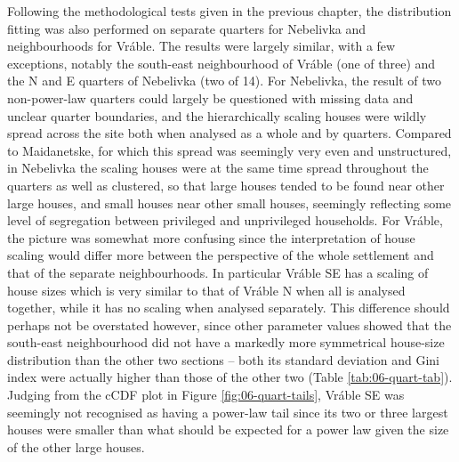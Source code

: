 \documentclass[
  12pt,
  a4paper, twoside]{book}
\begin{document}
Following the methodological tests given in the previous chapter, the distribution fitting was also performed on separate quarters for Nebelivka and neighbourhoods for Vráble. The results were largely similar, with a few exceptions, notably the south-east neighbourhood of Vráble (one of three) and the N and E quarters of Nebelivka (two of 14). For Nebelivka, the result of two non-power-law quarters could largely be questioned with missing data and unclear quarter boundaries, and the hierarchically scaling houses were wildly spread across the site both when analysed as a whole and by quarters. Compared to Maidanetske, for which this spread was seemingly very even and unstructured, in Nebelivka the scaling houses were at the same time spread throughout the quarters as well as clustered, so that large houses tended to be found near other large houses, and small houses near other small houses, seemingly reflecting some level of segregation between privileged and unprivileged households. For Vráble, the picture was somewhat more confusing since the interpretation of house scaling would differ more between the perspective of the whole settlement and that of the separate neighbourhoods. In particular Vráble SE has a scaling of house sizes which is very similar to that of Vráble N when all is analysed together, while it has no scaling when analysed separately. This difference should perhaps not be overstated however, since other parameter values showed that the south-east neighbourhood did not have a markedly more symmetrical house-size distribution than the other two sections -- both its standard deviation and Gini index were actually higher than those of the other two (Table \ref{tab:06-quart-tab}). Judging from the cCDF plot in Figure \ref{fig:06-quart-tails}, Vráble SE was seemingly not recognised as having a power-law tail since its two or three largest houses were smaller than what should be expected for a power law given the size of the other large houses.
\end{document}
